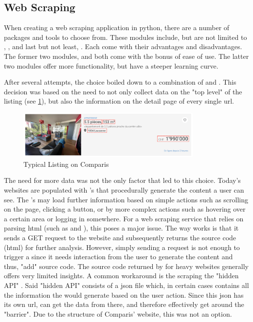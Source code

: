 \documentclass[main]{subfiles}
\begin{document}
\subsection{Web Scraping}

When creating a web scraping application in python, there are a number of packages and tools to choose from.
These modules include, but are not limited to \pkg[requests], \pkg[BeautifulSoup], \pkg[Scrapy] and last but not least, \pkg[Selenium].
Each come with their advantages and disadvantages. 
The former two modules, \pkg[requests] and \pkg[BeautifulSoup] both come with the bonus of ease of use.
The latter two modules offer more functionality, but have a steeper learning curve.

After several attempts, the choice boiled down to a combination of \pkg[Selenium] and \pkg[Scrapy].
This decision was based on the need to not only collect data on the "top level" of the listing (see \ref{fig:listing}), 
but also the information on the detail page of every single \acs*{url}.

\begin{figure}[htbp]
    \centerline{
        \includegraphics[width = 92mm]{prog_1.png}}
    \caption{Typical Listing on Comparis}
    \label{fig:listing}
\end{figure}

The need for more data was not the only factor that led to this choice.
Today's websites are populated with \js's that procedurally generate the content a user can see.
The \js's may load further information based on simple actions such as scrolling on the page,
clicking a button, or by more complex actions such as hovering over a certain area or logging in somewhere.
For a web scraping service that relies on parsing \acs*{html} (such as \pkg[requests] and \pkg[BeautifulSoup]), 
this poses a major issue.
The way \pkg[requests] works is that it sends a GET request to the website and subsequently returns the source code (\acs*{html}) for further analysis.
However, simply sending a request is not enough to trigger a \js since it needs interaction from the user to generate the content and thus, 
"add" source code.
The source code returned by \pkg[requests] for \js heavy websites generally offers very limited insights.
A common workaround is the scraping the "hidden API" \cite{johnwatsonrooneyAlwaysCheckHidden2021} \cite{eWebScrapingBeginners2019}.
Said "hidden API" consists of a \acs*{json} file which, in certain cases contains all the information the \js would generate based on the user action.
Since this  \acs*{json} has its own \acs*{url}, \pkg[requests] can get the data from there, 
and therefore effectively get around the "\js barrier".
Due to the structure of Comparis' website, this was not an option.
\end{document}
